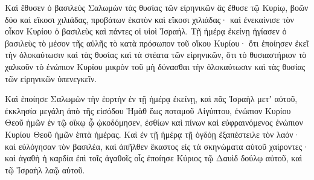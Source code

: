{Καὶ ἔθυσεν ὁ βασιλεὺς Σαλωμὼν τὰς θυσίας τῶν εἰρηνικῶν ἃς ἔθυσε τῷ Κυρίῳ, βοῶν δύο καὶ εἴκοσι χιλιάδας, προβάτων ἑκατὸν καὶ εἴκοσι χιλιάδας· καὶ ἐνεκαίνισε τὸν οἶκον Κυρίου ὁ βασιλεὺς καὶ πάντες οἱ υἱοὶ Ἰσραήλ.
Τῇ ἡμέρᾳ ἐκείνῃ ἡγίασεν ὁ βασιλεὺς τὸ μέσον τῆς αὐλῆς τὸ κατὰ πρόσωπον τοῦ οἴκου Κυρίου· ὅτι ἐποίησεν ἐκεῖ τὴν ὁλοκαύτωσιν καὶ τὰς θυσίας καὶ τὰ στέατα τῶν εἰρηνικῶν, ὅτι τὸ θυσιαστήριον τὸ χαλκοῦν τὸ ἐνώπιον Κυρίου μικρὸν τοῦ μὴ δύνασθαι τὴν ὁλοκαύτωσιν καὶ τὰς θυσίας τῶν εἰρηνικῶν ὑπενεγκεῖν.
\par }{\PP {}Καὶ ἑποίησε Σαλωμὼν τὴν ἑορτὴν ἐν τῇ ἡμέρᾳ ἐκείνῃ, καὶ πᾶς Ἰσραὴλ μετʼ αὐτοῦ, ἐκκλησία μεγάλη ἀπὸ τῆς εἰσόδου Ἡμὰθ ἕως ποταμοῦ Αἰγύπτου, ἐνώπιον Κυρίου Θεοῦ ἡμῶν ἐν τῷ οἴκῳ ᾧ ᾠκοδόμησεν, ἐσθίων καὶ πίνων καὶ εὐφραινόμενος ἐνώπιον Κυρίου Θεοῦ ἡμῶν ἑπτὰ ἡμέρας.
Καὶ ἐν τῇ ἡμέρᾳ τῇ ὀγδόῃ ἐξαπέστειλε τὸν λαόν· καὶ εὐλόγησαν τὸν βασιλέα, καὶ ἀπῆλθεν ἕκαστος εἰς τὰ σκηνώματα αὐτοῦ χαίροντες· καὶ ἀγαθὴ ἡ καρδία ἐπὶ τοῖς ἀγαθοῖς οἷς ἐποίησε Κύριος τῷ Δαυὶδ δούλῳ αὐτοῦ, καὶ τῷ Ἰσραὴλ λαῷ αὐτοῦ.

}
